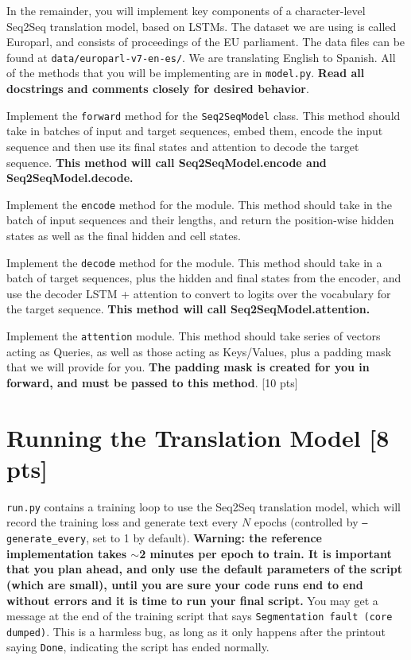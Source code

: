 \documentclass[11pt]{article}
\begin{document}
In the remainder, you will implement key components of a character-level Seq2Seq translation model, based on LSTMs. The dataset we are using is called Europarl, and consists of proceedings of the EU parliament. The data files can be found at \texttt{data/europarl-v7-en-es/}. We are translating English to Spanish. All of the methods that you will be implementing are in \texttt{model.py}. \textbf{Read all docstrings and comments closely for desired behavior}.

\vspace{2em}
 Implement the \texttt{forward} method for the \texttt{Seq2SeqModel} class. This method should take in batches of input and target sequences, embed them, encode the input sequence and then use its final states and attention to decode the target sequence. \textbf{This method will call Seq2SeqModel.encode and Seq2SeqModel.decode.}

\vspace{2em}
 Implement the \texttt{encode} method for the module. This method should take in the batch of input sequences and their lengths, and return the position-wise hidden states as well as the final hidden and cell states.

\vspace{2em}
 Implement the \texttt{decode} method for the module. This method should take in a batch of target sequences, plus the hidden and final states from the encoder, and use the decoder LSTM + attention to convert to logits over the vocabulary for the target sequence. \textbf{This method will call Seq2SeqModel.attention.}

\vspace{2em}
 Implement the \texttt{attention} module. This method should take series of vectors acting as Queries, as well as those acting as Keys/Values, plus a padding mask that we will provide for you. \textbf{The padding mask is created for you in forward, and must be passed to this method}. \hfill [10 pts]

\section{Running the Translation Model [8 pts]}

\texttt{run.py} contains a training loop to use the Seq2Seq translation model, which will record the training loss and generate text every $N$ epochs (controlled by \texttt{--generate\_every}, set to 1 by default). \textbf{Warning: the reference implementation takes $\sim$2 minutes per epoch to train. It is important that you plan ahead, and only use the default parameters of the script (which are small), until you are sure your code runs end to end without errors and it is time to run your final script.} You may get a message at the end of the training script that says \texttt{Segmentation fault (core dumped)}. This is a harmless bug, as long as it only happens after the printout saying \texttt{Done}, indicating the script has ended normally.
\end{document}
